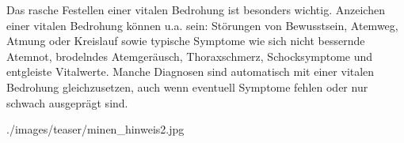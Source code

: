  {
Das rasche Festellen einer vitalen Bedrohung ist besonders wichtig. Anzeichen
einer vitalen Bedrohung können u.a. sein: Störungen von Be\-wusstsein, Atemweg,
Atmung oder Kreislauf sowie typische Symptome wie sich nicht bessernde Atemnot,
brodelndes Atem\-ge\-r\"ausch, Thoraxschmerz, Schocksymptome und entgleiste
Vital\-werte. Manche Diagnosen sind automatisch mit einer vitalen Bedrohung
gleichzusetzen, auch wenn eventuell Symptome fehlen oder nur schwach ausgeprägt
sind.

}{\vspace{1em}

}{./images/teaser/minen_hinweis2.jpg}{}{}


